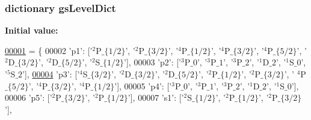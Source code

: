 \hypertarget{namespacepyneb_1_1utils_1_1physics_aab0d46710f5ecaa54ca513608a58299f}{
\subsubsection[{gs\-Level\-Dict}]{\setlength{\rightskip}{0pt plus 5cm}dictionary gs\-Level\-Dict}}\label{namespacepyneb_1_1utils_1_1physics_aab0d46710f5ecaa54ca513608a58299f}
{\bfseries Initial value\-:}
\begin{DoxyCode}
\hypertarget{namespacepyneb_1_1utils_1_1physics_l00001}{}\hyperlink{namespacepyneb_1_1utils_1_1physics}{00001} = \{
00002             \textcolor{stringliteral}{'p1'}: [\textcolor{stringliteral}{'$^2$P$\_\{1/2\}$'}, \textcolor{stringliteral}{'$^2$P$\_\{3/2\}$'}, \textcolor{stringliteral}{'$^4$P$\_\{1/2\}$'}, \textcolor{stringliteral}{'$^4$P$\_\{3/2\}$'}, \textcolor{stringliteral}{'$^4$P$\_\{5/2\}$'}, \textcolor{stringliteral}{'
      $^2$D$\_\{3/2\}$'}, \textcolor{stringliteral}{'$^2$D$\_\{5/2\}$'}, \textcolor{stringliteral}{'$^2$S$\_\{1/2\}$'}],
00003             \textcolor{stringliteral}{'p2'}: [\textcolor{stringliteral}{'$^3$P$\_0$'}, \textcolor{stringliteral}{'$^3$P$\_1$'}, \textcolor{stringliteral}{'$^3$P$\_2$'}, \textcolor{stringliteral}{'$^1$D$\_2$'}, \textcolor{stringliteral}{'$^1$S$\_0$'}, \textcolor{stringliteral}{'$^5$S$\_2$'}],
\hypertarget{namespacepyneb_1_1utils_1_1physics_l00004}{}\hyperlink{classpyneb_1_1utils_1_1physics_1_1_c_s_t}{00004}             \textcolor{stringliteral}{'p3'}: [\textcolor{stringliteral}{'$^4$S$\_\{3/2\}$'}, \textcolor{stringliteral}{'$^2$D$\_\{3/2\}$'}, \textcolor{stringliteral}{'$^2$D$\_\{5/2\}$'}, \textcolor{stringliteral}{'$^2$P$\_\{1/2\}$'}, \textcolor{stringliteral}{'$^2$P$\_\{3/2\}$'}, \textcolor{stringliteral}{'
      $^4$P$\_\{5/2\}$'}, \textcolor{stringliteral}{'$^4$P$\_\{3/2\}$'}, \textcolor{stringliteral}{'$^4$P$\_\{1/2\}$'}],
00005             \textcolor{stringliteral}{'p4'}: [\textcolor{stringliteral}{'$^3$P$\_0$'}, \textcolor{stringliteral}{'$^3$P$\_1$'}, \textcolor{stringliteral}{'$^3$P$\_2$'}, \textcolor{stringliteral}{'$^1$D$\_2$'}, \textcolor{stringliteral}{'$^1$S$\_0$'}],
00006             \textcolor{stringliteral}{'p5'}: [\textcolor{stringliteral}{'$^2$P$\_\{3/2\}$'}, \textcolor{stringliteral}{'$^2$P$\_\{1/2\}$'}],
00007             \textcolor{stringliteral}{'s1'}: [\textcolor{stringliteral}{'$^2$S$\_\{1/2\}$'}, \textcolor{stringliteral}{'$^2$P$\_\{1/2\}$'}, \textcolor{stringliteral}{'$^2$P$\_\{3/2\}$'}],

\end{DoxyCode}
